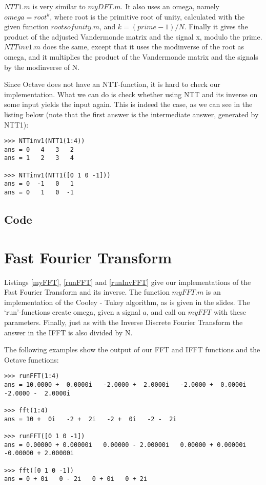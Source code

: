 \documentclass{article}
\begin{document}
$NTT1.m$ is very similar to $myDFT.m$.
 It also uses an omega, namely $omega = root^k$,
 where root is the primitive root of unity,
 calculated with the given function $rootsofunity.m$, and $k = (prime - 1)/N$.
 Finally it gives the product of the adjusted Vandermonde matrix and the signal x, modulo the prime.
 $NTTinv1.m$ does the same, except that it uses the modinverse of the root as omega,
and it multiplies the product of the Vandermonde matrix and the signals by the modinverse of N.

Since Octave does not have an NTT-function, it is hard to check our implementation.
What we can do is check whether using NTT and its inverse on some input yields
the input again. This is indeed the case, as we can see in the listing below (note that the first answer is the intermediate answer, generated by NTT1):

\begin{lstlisting}
>>> NTTinv1(NTT1(1:4))
ans = 0   4   3   2
ans = 1   2   3   4

>>> NTTinv1(NTT1([0 1 0 -1]))
ans = 0  -1   0   1
ans = 0   1   0  -1
\end{lstlisting}

\subsection{Code}
 
 
 

\section{Fast Fourier Transform}
  Listings \ref{myFFT}, \ref{runFFT} and \ref{runInvFFT} give our implementations of the Fast Fourier Transform and its inverse. The function $myFFT.m$ is an implementation of the Cooley - Tukey algorithm, as is given in the slides. The `run'-functions create omega, given a signal $a$, and call on $myFFT$ with these parameters. Finally, just as with the Inverse Discrete Fourier Transform the answer in the IFFT is also divided by N.

The following examples show the output of our FFT and IFFT functions and the Octave functions:

\begin{lstlisting}
>>> runFFT(1:4)
ans = 10.0000 +  0.0000i   -2.0000 +  2.0000i   -2.0000 +  0.0000i   -2.0000 -  2.0000i

>>> fft(1:4)
ans = 10 +  0i   -2 +  2i   -2 +  0i   -2 -  2i

>>> runFFT([0 1 0 -1])
ans = 0.00000 + 0.00000i   0.00000 - 2.00000i   0.00000 + 0.00000i   -0.00000 + 2.00000i

>>> fft([0 1 0 -1])
ans = 0 + 0i   0 - 2i   0 + 0i   0 + 2i
\end{lstlisting}
\end{document}
